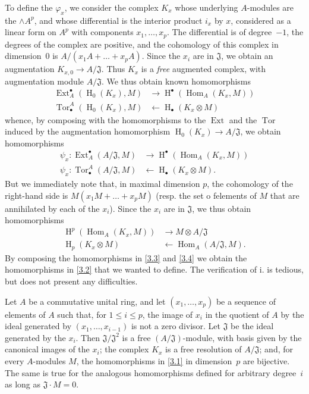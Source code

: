 \documentclass{article}
\theoremstyle{plain}
\newenvironment{proposition}[1]
  {\renewcommand\theinnercustomproposition{#1}\innercustomproposition}
  {\endinnercustomproposition}
\theoremstyle{definition}
\newcommand{\from}{\leftarrow}
\renewcommand{\leq}{\leqslant}
\DeclareMathOperator{\Ext}{Ext}
\DeclareMathOperator{\Hom}{Hom}
\DeclareMathOperator{\Tor}{Tor}
\DeclareMathOperator{\HH}{H}
\newcommand{\oldpage}[1]{\marginpar{\footnotesize$\Big\vert$ \textit{p.~#1}}}
\begin{document}
To define the $\varphi_x$, we consider the complex $K_x$ whose underlying $A$-modules are the $\wedge A^p$, and whose differential is the interior product $i_x$ by $x$, considered as a linear form on $A^p$ with components $x_1,\ldots,x_p$.
The differential is of degree~$-1$, the degrees of the complex are positive, and the cohomology of this complex in dimension~$0$ is $A/(x_1A+\ldots+x_pA)$.
Since the $x_i$ are in $\mathfrak{J}$, we obtain an augmentation $K_{x,0}\to A/\mathfrak{J}$.
Thus $K_x$ is a \emph{free} augmented complex, with augmentation module $A/\mathfrak{J}$.
We thus obtain known homomorphisms
\[
  \begin{aligned}
    \Ext_A^\bullet(\HH_0(K_x),M) &\to \HH^\bullet(\Hom_A(K_x,M))
  \\\Tor_\bullet^A(\HH_0(K_x),M) &\from \HH_\bullet(K_x\otimes M)
  \end{aligned}
\]
whence, by composing with the homomorphisms to the $\Ext$ and the $\Tor$ induced by the augmentation homomorphism $\HH_0(K_x)\to A/\mathfrak{J}$, we obtain homomorphisms
\[
\label{3.3}
  \begin{aligned}
    \psi_x\colon \Ext_A^\bullet(A/\mathfrak{J},M) &\to \HH^\bullet(\Hom_A(K_x,M))
  \\\psi_x\colon \Tor_\bullet^A(A/\mathfrak{J},M) &\from \HH_\bullet(K_x\otimes M).
  \end{aligned}
\tag{3.3}
\]
But we immediately note that, in maximal dimension $p$, the cohomology of the right-hand side is $M(x_1M+\ldots+x_pM)$ (resp. the set o felements of $M$ that are annihilated by each of the $x_i$).
Since the $x_i$ are in $\mathfrak{J}$, we thus obtain homomorphisms
\[
\label{3.4}
  \begin{aligned}
    \HH^p(\Hom_A(K_x,M)) &\to M\otimes A/\mathfrak{J}
  \\\HH_p(K_x\otimes M) &\from \Hom_A(A/\mathfrak{J},M).
  \end{aligned}
\tag{3.4}
\]
By composing the homomorphisms in \cref{3.3} and \cref{3.4} we obtain the homomorphisms in \cref{3.2} that we wanted to define.
The verification of i. is tedious, but does not present any difficulties.

\oldpage{149-07}
\begin{proposition}{4}
\label{proposition4}
  Let $A$ be a commutative unital ring, and let $(x_1,\ldots,x_p)$  be a sequence of elements of $A$ such that, for $1\leq i\leq p$, the image of $x_i$ in the quotient of $A$ by the ideal generated by $(x_1,\ldots,x_{i-1})$ is not a zero divisor.
  Let $\mathfrak{J}$ be the ideal generated by the $x_i$.
  Then $\mathfrak{J}/\mathfrak{J}^2$ is a free $(A/\mathfrak{J})$-module, with basis given by the canonical images of the $x_i$;
  the complex $K_x$ is a free resolution of $A/\mathfrak{J}$;
  and, for every $A$-modules $M$, the homomorphisms in \cref{3.1} in dimension~$p$ are bijective.
  The same is true for the analogous homomorphisms defined for arbitrary degree~$i$ as long as $\mathfrak{J}\cdot M=0$.
\end{proposition}
\end{document}
